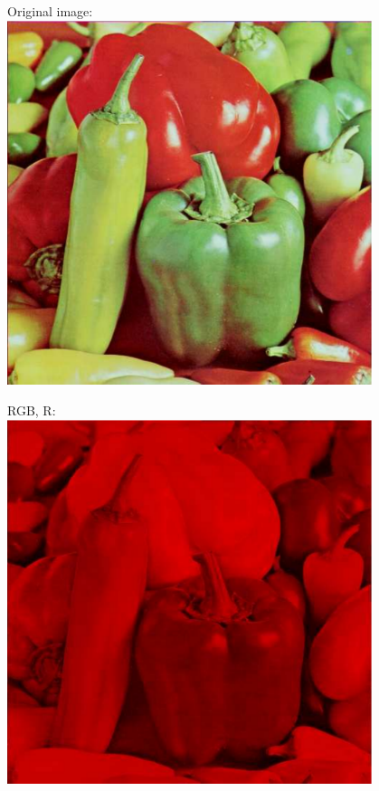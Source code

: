 \documentclass[a4paper,USenglish]{lipics}
\begin{document}
\begin{figure}
\begin{minipage}[b]{0.25\textwidth}
Original image:\\
\includegraphics[width=0.95\textwidth]{images/peppers}
\end{minipage}%
\begin{minipage}[b]{0.25\textwidth}
RGB, R:\\
\includegraphics[width=0.95\textwidth]{images/rgbR}

\end{minipage}
\end{figure}
\end{document}
